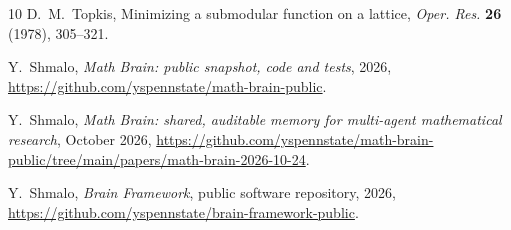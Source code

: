 \documentclass[11pt]{amsart}
\theoremstyle{remark}
\numberwithin{equation}{section}
\newcommand{\1}{\mathbf 1}
\begin{document}
\begin{thebibliography}{10}
D.~M.~Topkis, Minimizing a submodular function on a lattice, \emph{Oper. Res.} \textbf{26} (1978), 305--321.

 Y.~Shmalo, \emph{Math Brain: public snapshot, code and tests}, 2026, \url{https://github.com/yspennstate/math-brain-public}.

 Y.~Shmalo, \emph{Math Brain: shared, auditable memory for multi-agent mathematical research}, October 2026, \url{https://github.com/yspennstate/math-brain-public/tree/main/papers/math-brain-2026-10-24}.

 Y.~Shmalo, \emph{Brain Framework}, public software repository, 2026, \url{https://github.com/yspennstate/brain-framework-public}.

\end{thebibliography}
\end{document}
